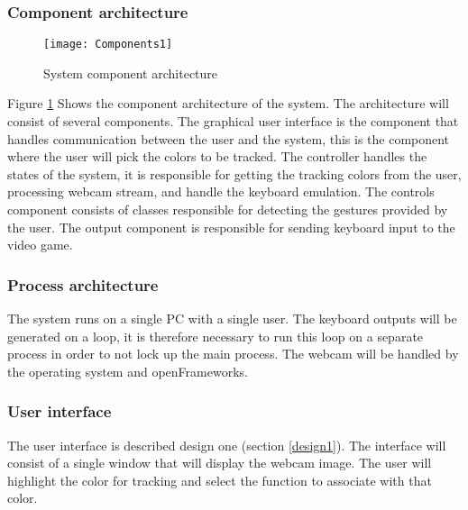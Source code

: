 \subsubsection{Component architecture}

\begin{figure}[h]
\centering
\texttt{[image: Components1]}
\caption{System component architecture}
\label{fig:components}
\end{figure}

Figure \ref{fig:components} Shows the component architecture of the system.
The architecture will consist of several components. The graphical user interface is the component that handles communication between the user and the system, this is the component where the user will pick the colors to be tracked. The controller handles the states of the system, it is responsible for getting the tracking colors from the user, processing webcam stream, and handle the keyboard emulation. The controls component consists of classes responsible for detecting the gestures provided by the user. The output component is responsible for sending keyboard input to the video game.

\subsubsection*{Process architecture}
The system runs on a single PC with a single user. The keyboard outputs will be generated on a loop, it is therefore necessary to run this loop on a separate process in order to not lock up the main process. The webcam will be handled by the operating system and openFrameworks.

\subsubsection{User interface}
The user interface is described design one (section \ref{design1}). The interface will consist of a single window that will display the webcam image. The user will highlight the color for tracking and select the function to associate with that color.